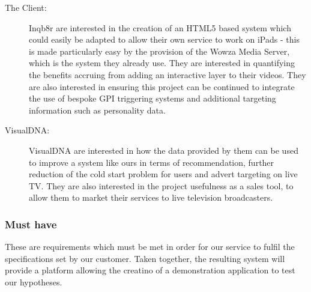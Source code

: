 \begin{description}
\item[The Client:]{Inqb8r are interested in the creation of an HTML5 based system which could easily be adapted to allow their own service to work on iPads - this is made particularly easy by the provision of the Wowza Media Server, which is the system they already use. They are interested in quantifying the benefits accruing from adding an interactive layer to their videos. They are also interested in ensuring this project can be continued to integrate the use of bespoke GPI triggering systems and additional targeting information such as personality data.}
\item[VisualDNA:]{VisualDNA are interested in how the data provided by them can be used to improve a system like ours in terms of recommendation, further reduction of the cold start problem for users and advert targeting on live TV. They are also interested in the project usefulness as a sales tool, to allow them to market their services to live television broadcasters.}
\end{description}

\subsubsection{Must have}
	These are requirements which must be met in order for our service to fulfil the specifications set by our customer. Taken together, the resulting system will provide a platform allowing the creatino of a demonstration application to test our hypotheses.
